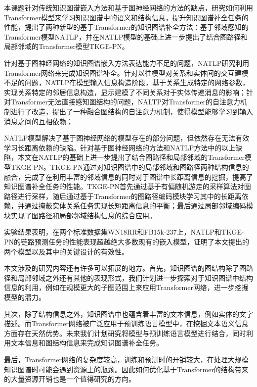 \summary
本课题针对传统知识图谱嵌入方法和基于图神经网络的方法的缺点，研究如何利用Transformer模型来学习知识图谱中的语义和结构信息，提升知识图谱补全任务的性能，提出了两种新型的基于Transformer的知识图谱补全方法：基于邻域感知的Transformer模型NATLP，并在NATLP模型的基础上进一步提出了结合图路径和局部邻域的Transformer模型TKGE-PN。

针对基于图神经网络的知识图谱嵌入方法表达能力不足的问题，NATLP研究利用Transformer网络来完成知识图谱补全。针对以往模型对关系和实体间的交互建模不足的问题，NATLP在模型输入信息构造阶段，基于关系生成特定的网络参数，实现关系特定的邻居信息构造，显示建模了不同关系对于实体传递消息的影响；针对Transformer无法直接感知图结构的问题，NALTP对Transformer的自注意力机制进行了改造，提出了一种融合图结构的自注意力机制，使得模型能够学习到输入消息之间的互相依赖；

NATLP模型解决了基于图神经网络的模型存在的部分问题，但依然存在无法有效学习长距离依赖的缺陷。针对基于图神经网络的方法和NATLP方法中的以上缺陷，本文在NATLP的基础上进一步提出了结合图路径和局部邻域的Transformer模型TKGE-PN。TKGE-PN通过对知识图谱中的局部邻域和图路径两种结构信息的融合，完成了在利用丰富的邻域信息的同时对于图谱中长距离信息的挖掘，提高了知识图谱补全任务的性能。TKGE-PN首先通过基于有偏随机游走的采样算法对图路径进行采样，随后通过基于Transformer的图路径编码模块学习其中的长距离依赖，并通过掩蔽实体关系任务实现长短距离信息的平衡；最后通过局部邻域编码模块实现了图路径和局部邻域结构信息的综合应用。

实验结果表明，在两个标准数据集WN18RR和FB15k-237上，NATLP和TKGE-PN的链路预测任务的性能表现超越绝大多数现有的嵌入模型，证明了本文提出的两个模型以及其中的关键设计的有效性。


本文涉及的研究内容还有许多可以拓展的地方。首先，知识图谱的图结构除了图路径和局部邻域之外还有其他的表现形式，我们计划进一步探索对于知识图谱中结构信息的利用，例如在规模更大的子图范围上来应用Transformer网络，进一步挖掘模型的潜力。

其次，除了结构信息之外，知识图谱中也蕴含着丰富的文本信息，例如实体的文字描述。而Transformer网络被广泛应用于预训练语言模型中，在挖掘文本语义信息方面存在天然优势。未来我们计划研究将模型与预训练语言模型进行结合，同时利用文本信息和图结构信息来完成知识图谱补全任务。

最后，Transformer网络的复杂度较高，训练和预测时的开销较大，在处理大规模知识图谱时可能会遇到资源上的瓶颈。因此如何优化基于Transformer的结构带来的大量资源开销也是一个值得研究的方向。

